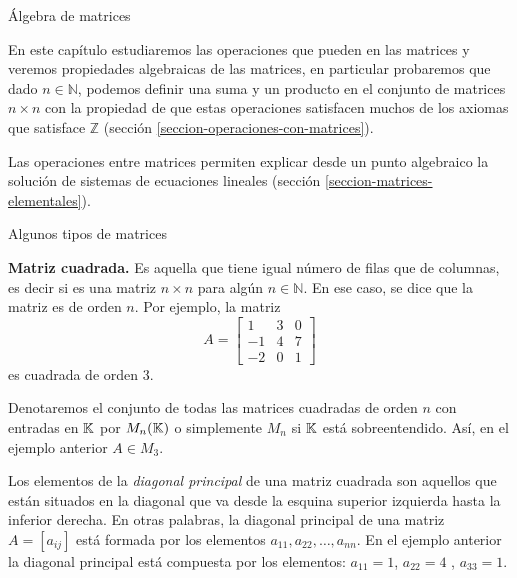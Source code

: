 \begin{chapter}{\'Algebra de matrices}\label{chap-algebra-de-matrices}
            
            En  este capítulo estudiaremos las operaciones que pueden en las  matrices y veremos propiedades algebraicas de las matrices,  en particular probaremos que dado $n\in \mathbb N$,  podemos definir una suma y un producto en el conjunto de matrices $n \times n$ con la propiedad de que estas operaciones satisfacen muchos de los axiomas que satisface  $\mathbb Z$ (sección \ref{seccion-operaciones-con-matrices}).

            Las operaciones entre matrices permiten explicar desde un punto algebraico la solución de sistemas de ecuaciones lineales (sección \ref{seccion-matrices-elementales}).

            \begin{section}{Algunos tipos de matrices}\label{seccion-algunos-tipos-de-matrices}
                
                \textbf{Matriz cuadrada.} Es aquella que tiene igual número de filas que de columnas, es decir si es una matriz $n \times n$ para algún $n \in\mathbb N$. En ese caso, se dice que la matriz es de orden $n$. Por ejemplo, la matriz
                \begin{equation*}
                A= \begin{bmatrix}
                1&3&0\\-1&4&7\\-2&0&1
                \end{bmatrix}
                \end{equation*}
                es cuadrada de orden $3$.
                
                Denotaremos el conjunto de todas las matrices cuadradas de orden $n$ con entradas en $\mathbb K$ por $M_n(\mathbb K)$ o simplemente $M_n$ si $\mathbb K$  está sobreentendido. Así, en el     ejemplo anterior $A \in M_3$.
                
                Los elementos de la \textit{diagonal principal} de una matriz cuadrada son aquellos que están situados
                en la diagonal que va desde la esquina superior izquierda hasta la inferior derecha. En otras
                palabras, la diagonal principal de una matriz $A=[a_{ij}]$ está formada por los elementos
                $a_{11},a_{22},\ldots,a_{nn}$.  En el ejemplo anterior la diagonal principal está compuesta por los elementos: $a_{11} = 1$, $a_{22} = 4$ , $a_{33} = 1$.


\end{section}
\end{chapter}
